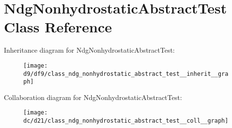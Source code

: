 \hypertarget{class_ndg_nonhydrostatic_abstract_test}{}\section{Ndg\+Nonhydrostatic\+Abstract\+Test Class Reference}
\label{class_ndg_nonhydrostatic_abstract_test}


Inheritance diagram for Ndg\+Nonhydrostatic\+Abstract\+Test\+:
\nopagebreak
\begin{figure}[H]
\begin{center}
\leavevmode
\texttt{[image: d9/df9/class\_ndg\_nonhydrostatic\_abstract\_test\_\_inherit\_\_graph]}
\end{center}
\end{figure}


Collaboration diagram for Ndg\+Nonhydrostatic\+Abstract\+Test\+:
\nopagebreak
\begin{figure}[H]
\begin{center}
\leavevmode
\texttt{[image: dc/d21/class\_ndg\_nonhydrostatic\_abstract\_test\_\_coll\_\_graph]}
\end{center}
\end{figure}
